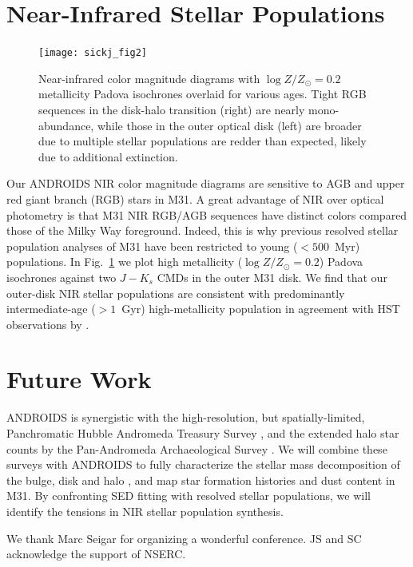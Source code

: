 \documentclass[11pt,twoside]{article}
\begin{document}
\section{Near-Infrared Stellar Populations}

\begin{figure}[t]
\centering
\texttt{[image: sickj\_fig2]}
\caption{Near-infrared color magnitude diagrams with $\log Z/Z_\odot=0.2$ metallicity Padova isochrones overlaid for various ages.
Tight RGB sequences in the disk-halo transition (right) are nearly mono-abundance, while those in the outer optical disk (left) are broader due to multiple stellar populations are redder than expected, likely due to additional extinction.}
\label{fig:cmd}
\end{figure}

Our ANDROIDS NIR color magnitude diagrams are sensitive to AGB and upper red giant branch (RGB) stars in M31.
A great advantage of NIR over optical photometry is that M31 NIR RGB/AGB sequences have distinct colors compared those of the Milky Way foreground.
Indeed, this is why previous resolved stellar population analyses of M31 \citep[e.g.,][]{Williams:2003} have been restricted to young ($<500$~Myr) populations.
In Fig.~\ref{fig:cmd} we plot high metallicity ($\log Z/Z_\odot = 0.2$) Padova isochrones \citep{Marigo:2008} against two $J-K_s$ CMDs in the outer M31 disk.
We find that our outer-disk NIR stellar populations are consistent with predominantly intermediate-age ($>1$~Gyr) high-metallicity population in agreement with HST observations by \cite{Brown:2006}.

\section{Future Work}

ANDROIDS is synergistic with the high-resolution, but spatially-limited, Panchromatic Hubble Andromeda Treasury Survey \citep{Dalcanton:2012}, and the extended halo star counts by the Pan-Andromeda Archaeological Survey \citep{McConnachie:2009}.
We will combine these surveys with ANDROIDS to fully characterize the stellar mass decomposition of the bulge, disk and halo \citep[e.g.,][]{Courteau:2011}, and map star formation histories and dust content in M31.
By confronting SED fitting with resolved stellar populations, we will identify the tensions in NIR stellar population synthesis.

\acknowledgements We thank Marc Seigar for organizing a wonderful conference. JS and SC acknowledge the support of NSERC.


\end{document}
